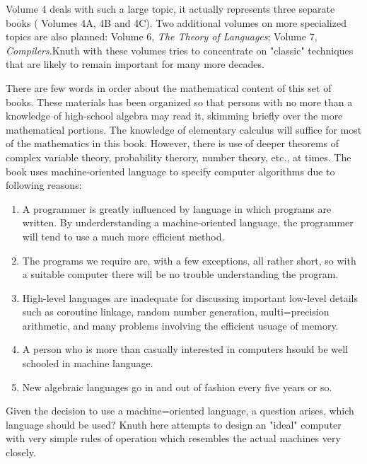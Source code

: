 \documentclass{article}
\begin{document}
Volume 4 deals with such a large topic, it actually represents three separate books ( Volumes 4A, 4B and 4C). Two additional volumes on more specialized topics are also planned: Volume 6, \textit{The Theory of Languages}; Volume 7, \textit{Compilers}.Knuth with these volumes tries to concentrate on "classic" techniques that are likely to remain important for many more decades. 

There are few words in order about the mathematical content of this set of books. These materials has been organized so that persons with no more than a knowledge of high-school algebra may read it, skimming briefly over the more mathematical portions. The knowledge of elementary calculus will suffice for most of the mathematics in this book. However, there is use of deeper theorems of complex variable theory, probability therory, number theory, etc., at times. The book uses machine-oriented language to specify computer algorithms due to following reasons:
\begin{enumerate}
    \item A programmer is greatly influenced by language in which programs are written. By underderstanding a machine-oriented language, the programmer will tend to use a much more efficient method.
    \item The programs we require are, with a few exceptions, all rather short, so with a suitable computer there will be no trouble understanding the program.
    \item High-level languages are inadequate for discussing important low-level details such as coroutine linkage, random number generation, multi=precision arithmetic, and many problems involving the efficient usuage of memory.
    \item A person who is more than casually interested in computers hsould be well schooled in machine language.
    \item New algebraic languages go in and out of fashion every five years or so.
\end{enumerate}

Given the decision to use a machine=oriented language, a question arises, which language should be used? Knuth here attempts to design an "ideal" computer with very simple rules of operation which resembles the actual machines very closely.
\end{document}
